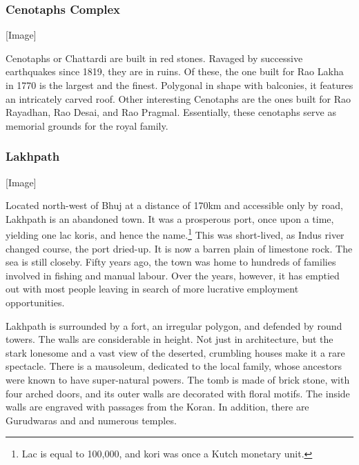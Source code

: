 
\subsubsection{Cenotaphs Complex} %
\label{ssub:ctc}

[Image]

Cenotaphs or Chattardi are built in red stones. Ravaged by successive earthquakes since 1819, they are in ruins. Of these, the one built for Rao Lakha in 1770 is the largest and the finest. Polygonal in shape with balconies, it features an intricately carved roof. Other interesting Cenotaphs are the ones built for Rao Rayadhan, Rao Desai, and Rao Pragmal. Essentially, these cenotaphs serve as memorial grounds for the royal family.


\subsubsection{Lakhpath} %
\label{ssub:lakhpath}

[Image]

Located north-west of Bhuj at a distance of 170km and accessible only by road, Lakhpath is an abandoned town. It was a prosperous port, once upon a time, yielding one lac koris, and hence the name.\footnote{Lac is equal to 100,000, and kori was once a Kutch monetary unit.} This was short-lived, as Indus river changed course, the port dried-up. It is now a barren plain of limestone rock. The sea is still closeby. Fifty years ago, the town was home to hundreds of families involved in fishing and manual labour. Over the years, however, it has emptied out with most people leaving in search of more lucrative employment opportunities.

Lakhpath is surrounded by a fort, an irregular polygon, and defended by round towers. The walls are considerable in height. Not just in architecture, but the stark lonesome and a vast view of the deserted, crumbling houses make it a rare spectacle. There is a mausoleum, dedicated to the local family, whose ancestors were known to have super-natural powers. The tomb is made of brick stone, with four arched doors, and its outer walls are decorated with floral motifs. The inside walls are engraved with passages from the Koran. In addition, there are Gurudwaras and and numerous temples.


